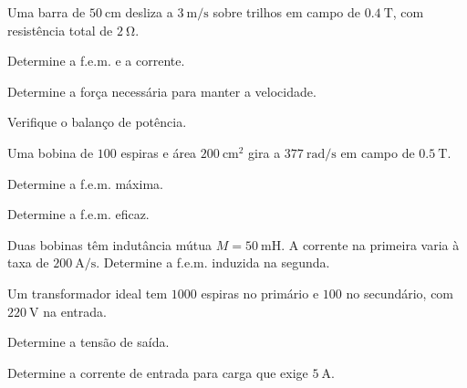 \blocoaplicacao
\begin{questao}[2]{}

Uma barra de $\SI{50}{\centi\meter}$ desliza a $\SI{3}{\meter\per\second}$
sobre trilhos em campo de $\SI{0.4}{\tesla}$, com resistência total de
$\SI{2}{\ohm}$.
\begin{itensq}
\item Determine a f.e.m. e a corrente.
\item Determine a força necessária para manter a velocidade.
\item Verifique o balanço de potência.
\end{itensq}


\end{questao}
\begin{questao}[2]{}

Uma bobina de $100$ espiras e área $\SI{200}{\centi\meter\squared}$ gira a
$\SI{377}{\radian\per\second}$ em campo de $\SI{0.5}{\tesla}$.
\begin{itensq}
\item Determine a f.e.m. máxima.
\item Determine a f.e.m. eficaz.
\end{itensq}


\end{questao}
\begin{questao}[2]{}

Duas bobinas têm indutância mútua $M=\SI{50}{\milli\henry}$. A corrente na
primeira varia à taxa de $\SI{200}{\ampere\per\second}$. Determine a f.e.m.
induzida na segunda.


\end{questao}
\begin{questao}[2]{}

Um transformador ideal tem $1000$ espiras no primário e $100$ no secundário,
com $\SI{220}{\volt}$ na entrada.
\begin{itensq}
\item Determine a tensão de saída.
\item Determine a corrente de entrada para carga que exige
      $\SI{5}{\ampere}$.
\end{itensq}


\end{questao}
